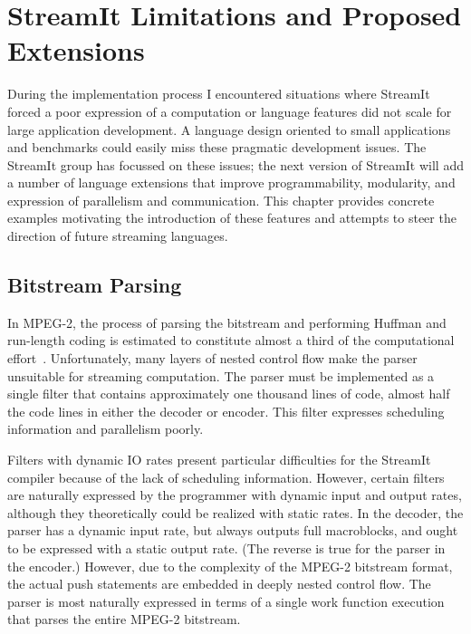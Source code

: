 \chapter{StreamIt Limitations and Proposed Extensions}
\label{section:impl_issues}

During the implementation process I encountered situations 
 where StreamIt forced a poor expression of a computation or 
language features did not scale for large application development. 
A language design oriented to small applications and benchmarks could easily 
miss these pragmatic development issues. The StreamIt group has focussed on 
these issues; 
the next version of StreamIt will add a number of language
extensions that improve programmability, modularity, 
and expression of parallelism and 
communication. 
This chapter provides concrete 
examples motivating
the introduction of these features and attempts to steer the direction of 
future streaming languages.

\section{Bitstream Parsing}

In MPEG-2, the process of parsing the bitstream and performing Huffman 
and run-length coding is estimated to constitute almost a third 
of the computational effort~\cite{iwata98coarse}. Unfortunately, many 
layers of nested control flow make the parser unsuitable for streaming 
computation. The parser must be implemented as a single filter that 
contains approximately one thousand lines of code, almost half the code 
lines in either the decoder or encoder. This filter expresses scheduling 
information and parallelism poorly. 

Filters with dynamic IO rates present particular difficulties for the 
StreamIt compiler because of the lack of scheduling information. However, 
certain filters are naturally expressed by the programmer with dynamic 
input and output rates, although they theoretically could 
be realized with static rates. 
In the decoder, the parser has a dynamic 
input rate, but always outputs full macroblocks, and ought to be expressed 
with a static output rate. (The reverse is true for the parser in the encoder.) 
However, due to the complexity of the MPEG-2 bitstream format, the actual 
push statements are embedded in deeply nested control flow. The parser is 
most naturally expressed in terms of a single work function execution 
that parses the entire MPEG-2 bitstream. 


